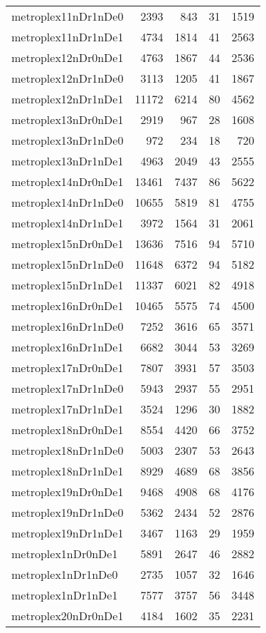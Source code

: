 \begin{longtable}{lrrrr}
metroplex11nDr1nDe0 & 2393 & 843 & 31 & 1519 \\
metroplex11nDr1nDe1 & 4734 & 1814 & 41 & 2563 \\
metroplex12nDr0nDe1 & 4763 & 1867 & 44 & 2536 \\
metroplex12nDr1nDe0 & 3113 & 1205 & 41 & 1867 \\
metroplex12nDr1nDe1 & 11172 & 6214 & 80 & 4562 \\
metroplex13nDr0nDe1 & 2919 & 967 & 28 & 1608 \\
metroplex13nDr1nDe0 & 972 & 234 & 18 & 720 \\
metroplex13nDr1nDe1 & 4963 & 2049 & 43 & 2555 \\
metroplex14nDr0nDe1 & 13461 & 7437 & 86 & 5622 \\
metroplex14nDr1nDe0 & 10655 & 5819 & 81 & 4755 \\
metroplex14nDr1nDe1 & 3972 & 1564 & 31 & 2061 \\
metroplex15nDr0nDe1 & 13636 & 7516 & 94 & 5710 \\
metroplex15nDr1nDe0 & 11648 & 6372 & 94 & 5182 \\
metroplex15nDr1nDe1 & 11337 & 6021 & 82 & 4918 \\
metroplex16nDr0nDe1 & 10465 & 5575 & 74 & 4500 \\
metroplex16nDr1nDe0 & 7252 & 3616 & 65 & 3571 \\
metroplex16nDr1nDe1 & 6682 & 3044 & 53 & 3269 \\
metroplex17nDr0nDe1 & 7807 & 3931 & 57 & 3503 \\
metroplex17nDr1nDe0 & 5943 & 2937 & 55 & 2951 \\
metroplex17nDr1nDe1 & 3524 & 1296 & 30 & 1882 \\
metroplex18nDr0nDe1 & 8554 & 4420 & 66 & 3752 \\
metroplex18nDr1nDe0 & 5003 & 2307 & 53 & 2643 \\
metroplex18nDr1nDe1 & 8929 & 4689 & 68 & 3856 \\
metroplex19nDr0nDe1 & 9468 & 4908 & 68 & 4176 \\
metroplex19nDr1nDe0 & 5362 & 2434 & 52 & 2876 \\
metroplex19nDr1nDe1 & 3467 & 1163 & 29 & 1959 \\
metroplex1nDr0nDe1 & 5891 & 2647 & 46 & 2882 \\
metroplex1nDr1nDe0 & 2735 & 1057 & 32 & 1646 \\
metroplex1nDr1nDe1 & 7577 & 3757 & 56 & 3448 \\
metroplex20nDr0nDe1 & 4184 & 1602 & 35 & 2231 \\

\end{longtable}
